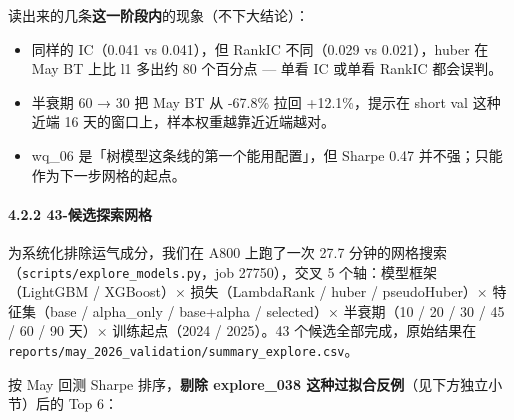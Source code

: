 \documentclass[
  fontset=fandol]{ctexart}
\providecommand{\tightlist}{%
  \setlength{\itemsep}{0pt}\setlength{\parskip}{0pt}}
\begin{document}
读出来的几条\textbf{这一阶段内}的现象（不下大结论）：

\begin{itemize}
\tightlist
\item
  同样的 IC（0.041 vs 0.041），但 RankIC
  不同（0.029 vs 0.021），huber 在 May
  BT 上比 l1 多出约 80 个百分点 --- 单看
  IC 或单看 RankIC 都会误判。
\item
  半衰期 60 → 30 把 May BT 从 -67.8\%
  拉回 +12.1\%，提示在 short val
  这种近端 16
  天的窗口上，样本权重越靠近近端越对。
\item
  wq\_06
  是「树模型这条线的第一个能用配置」，但
  Sharpe 0.47
  并不强；只能作为下一步网格的起点。
\end{itemize}

\hypertarget{ux5019ux9009ux63a2ux7d22ux7f51ux683c}{%
\paragraph{4.2.2
43-候选探索网格}\label{ux5019ux9009ux63a2ux7d22ux7f51ux683c}}

为系统化排除运气成分，我们在 A800
上跑了一次 27.7
分钟的网格搜索（\texttt{scripts/explore\_models.py}，job
27750），交叉 5 个轴：模型框架（LightGBM
/ XGBoost）× 损失（LambdaRank / huber /
pseudoHuber）× 特征集（base /
alpha\_only / base+alpha / selected）×
半衰期（10 / 20 / 30 / 45 / 60 / 90
天）× 训练起点（2024 / 2025）。43
个候选全部完成，原始结果在
\texttt{reports/may\_2026\_validation/summary\_explore.csv}。

按 May 回测 Sharpe 排序，\textbf{剔除
explore\_038
这种过拟合反例}（见下方独立小节）后的
Top 6：
\end{document}
